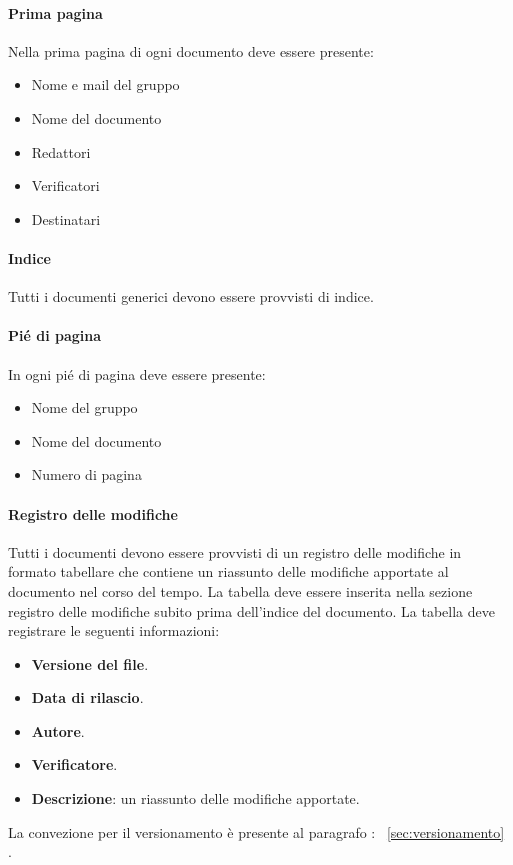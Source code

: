 \documentclass{article}
\begin{document}
\paragraph*{Prima pagina}
Nella prima pagina di ogni documento deve essere presente:
\begin{itemize}
    \item Nome e mail del gruppo
    \item Nome del documento 
    \item Redattori
    \item Verificatori
    \item Destinatari
\end{itemize}
\paragraph*{Indice}
Tutti i documenti generici devono essere provvisti di indice.
\paragraph*{Pié di pagina}
In ogni pié di pagina deve essere presente:
\begin{itemize}
    \item Nome del gruppo
    \item Nome del documento 
    \item Numero di pagina
\end{itemize}
\paragraph*{Registro delle modifiche}\label{sec:RegistroModifiche}
Tutti i documenti devono essere provvisti di un registro delle modifiche in formato tabellare che contiene un riassunto
delle modifiche apportate al documento nel corso del tempo.
La tabella  deve essere inserita nella
sezione registro delle modifiche subito prima dell’indice del documento.
La tabella deve registrare le seguenti informazioni:
\begin{itemize}
\item \textbf{Versione del file}.
\item \textbf{Data di rilascio}.
\item \textbf{Autore}.
\item \textbf{Verificatore}.
\item \textbf{Descrizione}: un riassunto delle modifiche apportate.
\end{itemize}
La convezione per il versionamento è presente al paragrafo : ~\ref{sec:versionamento} .
\end{document}
